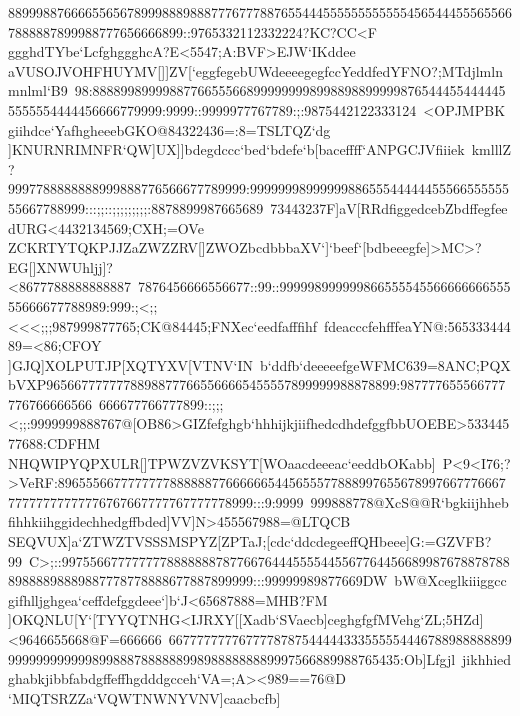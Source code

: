 {{{ 8899988766665565678999888988877767778876554445555555555554565444555655667888887899988777656666899::9765332112332224?KC?CC<F%
 ggghdTYbe`LcfghggghcA?E<5547;A:BVF>EJW`IKddee}
 \hbox{aVUSOJVOHFHUYMV[]]ZV[`eggfegebUWdeeeegegfccYeddfedYFNO?;MTdjlmlnmnlml`B9%
 98:888899899998877665556689999999989988988999998765444554444455555554444456666779999:9999::9999977767789:;:9875442122333124%
 <OPJMPBKgiihdce`YafhgheeebGKO@84322436=:8=TSLTQZ`dg}
 \hbox{]KNURNRIMNFR`QW]UX]]bdegdccc`bed`bdefe`b[baceffff`ANPGCJVfiiiek%
 kmlllZ?9997788888888999888776566677789999:999999989999998865554444445556655555555667788999:::;;::;;;;;;;;;:8878899987665689%
 73443237F]aV[RRdfiggedcebZbdffegfeedURG<4432134569;CXH;=OVe}
 \hbox{ZCKRTYTQKPJJZaZWZZRV[]ZWOZbcdbbbaXV`]`beef`[bdbeeegfe]>MC>?EG[]XNWUhljj]?<8677788888888887%
 7876456666556677::99::99999899999986655554556666666655555666677788989:999:;<;;<<<;;;987999877765;CK@84445;FNXec`eedfafffihf%
 fdeacccfehfffeaYN@:56533344489=<86;CFOY}
 \hbox{]GJQ]XOLPUTJP[XQTYXV[VTNV`IN%
 b`ddfb`deeeeefgeWFMC639=8ANC;PQXbVXP96566777777788988777665566665455557899999988878899:987777655566777776766666566%
 666677766777899::;;;<;;:9999999888767@[OB86>GIZfefghgb`hhhijkjiifhedcdhdefggfbbUOEBE>53344577688:CDFHM}
 \hbox{NHQWIPYQPXULR[]TPWZVZVKSYT[WOaacdeeeac`eeddbOKabb]%
 P<9<I76;?>VeRF:896555667777777788888877666666544565557788899765567899766777666777777777777776767667777767777778999:::9:9999%
 999888778@XcS@@R`bgkiijhhebfihhkiihggidechhedgffbded]VV]N>455567988=@LTQCB}
 \hbox{SEQVUX]a`ZTWZTVSSSMSPYZ[ZPTaJ;[cdc`ddcdegeeffQHbeee]G:=GZVFB?99%
 C>;::997556677777777888888878776676444555544556776445668998767887878889888898889887778778888677887899999:::99999989877669DW%
 bW@Xceglkiiiggccgifhlljghgea`ceffdefggdeee`]b`J<65687888=MHB?FM}
 \hbox{]OKQNLU[Y`[TYYQTNHG<IJRXY[[Xadb`SVaecb]ceghgfgfMVehg`ZL;5HZd]<9646655668@F=666666%
 667777777767777878754444433355555444678898888889999999999999989988878888889989888888889997566889988765435:Ob]Lfgjl%
 jikhhiedghabkjibbfabdgffeffhgdddgcceh`VA=;A><989==76@D}
 \hbox{`MIQTSRZZa`VQWTNWNYVNV]caacbcfb]%
}}}
